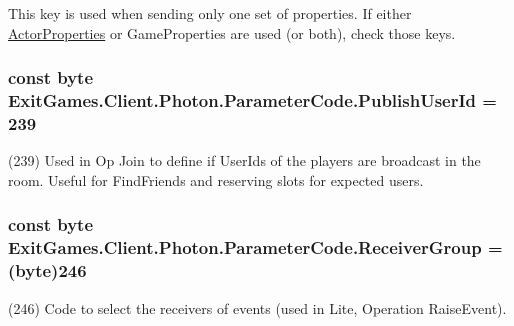 This key is used when sending only one set of properties. If either \hyperlink{class_exit_games_1_1_client_1_1_photon_1_1_actor_properties}{Actor\+Properties} or Game\+Properties are used (or both), check those keys. 
\subsubsection[{\texorpdfstring{Publish\+User\+Id}{PublishUserId}}]{\setlength{\rightskip}{0pt plus 5cm}const byte Exit\+Games.\+Client.\+Photon.\+Parameter\+Code.\+Publish\+User\+Id = 239}\hypertarget{class_exit_games_1_1_client_1_1_photon_1_1_parameter_code_a108e552f24426fdb1155733903ccb998}{}\label{class_exit_games_1_1_client_1_1_photon_1_1_parameter_code_a108e552f24426fdb1155733903ccb998}


(239) Used in Op Join to define if User\+Ids of the players are broadcast in the room. Useful for Find\+Friends and reserving slots for expected users.

\subsubsection[{\texorpdfstring{Receiver\+Group}{ReceiverGroup}}]{\setlength{\rightskip}{0pt plus 5cm}const byte Exit\+Games.\+Client.\+Photon.\+Parameter\+Code.\+Receiver\+Group = (byte)246}\hypertarget{class_exit_games_1_1_client_1_1_photon_1_1_parameter_code_a66d8a56e50e4d9b1864ef0dfe6b7c64a}{}\label{class_exit_games_1_1_client_1_1_photon_1_1_parameter_code_a66d8a56e50e4d9b1864ef0dfe6b7c64a}


(246) Code to select the receivers of events (used in Lite, Operation Raise\+Event).

